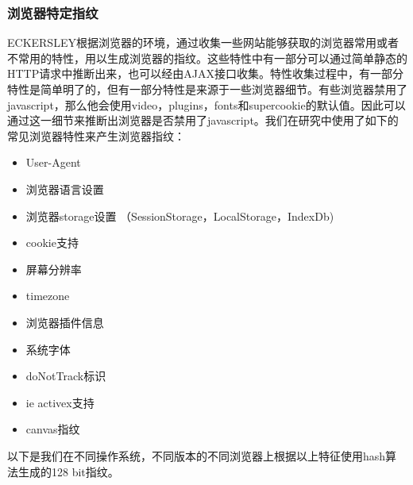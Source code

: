 \documentclass[doctor,privacy,twoside]{buaa_mac}
\begin{document}
\subsubsection{浏览器特定指纹}
ECKERSLEY根据浏览器的环境，通过收集一些网站能够获取的浏览器常用或者不常用的特性，用以生成浏览器的指纹。这些特性中有一部分可以通过简单静态的HTTP请求中推断出来，也可以经由AJAX接口收集。特性收集过程中，有一部分特性是简单明了的，但有一部分特性是来源于一些浏览器细节。有些浏览器禁用了javascript，那么他会使用video，plugins，fonts和supercookie的默认值。因此可以通过这一细节来推断出浏览器是否禁用了javascript。我们在研究中使用了如下的常见浏览器特性来产生浏览器指纹：

\begin{itemize}
\item User-Agent
\item 浏览器语言设置
\item 浏览器storage设置 （SessionStorage，LocalStorage，IndexDb)
\item cookie支持
\item 屏幕分辨率
\item timezone
\item 浏览器插件信息
\item 系统字体
\item doNotTrack标识
\item ie activex支持
\item canvas指纹
 \end{itemize}
 
 以下是我们在不同操作系统，不同版本的不同浏览器上根据以上特征使用hash算法生成的128 bit指纹。
 
\end{document}
